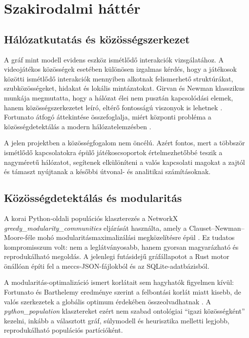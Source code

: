 \chapter{Szakirodalmi háttér}

\section{Hálózatkutatás és közösségszerkezet}

A gráf mint modell evidens eszköz ismétlődő interakciók vizsgálatához. A videojátékos közösségek esetében különösen izgalmas kérdés, hogy a játékosok közötti ismétlődő interakciók mennyiben alkotnak felismerhető struktúrákat, szubközösségeket, hidakat és lokális mintázatokat. Girvan és Newman klasszikus munkája megmutatta, hogy a hálózat élei nem pusztán kapcsolódási elemek, hanem közösségszerkezetet leíró, eltérő fontosságú viszonyok is lehetnek \cite{girvannewman}. Fortunato átfogó áttekintése összefoglalja, miért központi probléma a közösségdetektálás a modern hálózatelemzésben \cite{fortunato2010}.

A jelen projektben a közösségfogalom nem öncélú. Azért fontos, mert a többször ismétlődő kapcsolatokra épülő játékoscsoportok értelmezhetőbbé teszik a nagyméretű hálózatot, segítenek elkülöníteni a valós kapcsolati magokat a zajtól és támaszt nyújtanak a későbbi útvonal- és analitikai számításoknak.

\section{Közösségdetektálás és modularitás}

A korai Python-oldali populációs klaszterezés a NetworkX \textit{greedy\_modularity\_communities} eljárását használta, amely a Clauset–Newman–Moore-féle mohó modularitásmaximalizálási megközelítésre épül \cite{clauset2004,networkx_greedy}. Ez tudatos kompromisszum volt: nem a leglátványosabb, hanem gyorsan magyarázható és reprodukálható megoldás. A jelenlegi futásidejű gráfállapotot a Rust motor önállóan építi fel a meccs-JSON-fájlokból és az SQLite-adatbázisból.

A modularitás-optimalizáció ismert korlátait sem hagyhatók figyelmen kívül: Fortunato és Barthelemy eredménye szerint a felbontási korlát miatt kisebb, de valós szerkezetek a globális optimum érdekében összeolvadhatnak \cite{fortunato_barthelemy2007}. A \textit{python\_population} klasztereket ezért nem szabad ontológiai ``igazi közösségként'' kezelni, inkább a választott gráf, súlymodell és heurisztika melletti legjobb, reprodukálható populációs partícióként.

